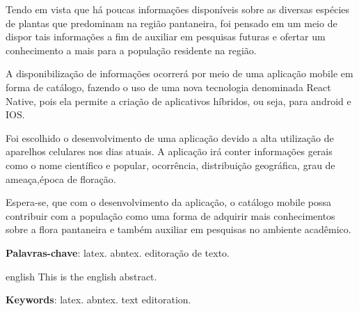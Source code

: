 
\setlength{\absparsep}{18pt} %
\begin{resumo}
	
	Tendo em vista que há poucas informações disponíveis sobre as diversas espécies de plantas que predominam na região pantaneira, foi pensado em um meio de dispor tais informações a fim de auxiliar em pesquisas futuras e ofertar um conhecimento a mais para a população residente na região.
	
	A disponibilização de informações ocorrerá por meio de uma aplicação mobile em forma de catálogo, fazendo o uso de uma nova tecnologia denominada React Native, pois ela permite a criação de aplicativos híbridos, ou seja, para android e IOS.
	
	Foi escolhido o desenvolvimento de uma aplicação devido a alta utilização de aparelhos celulares nos dias atuais. A aplicação irá conter informações gerais como o nome científico e popular, ocorrência, distribuição geográfica, grau de ameaça,época de floração.
	
	Espera-se, que com o desenvolvimento da aplicação, o  catálogo mobile possa contribuir com a população como uma forma de adquirir mais conhecimentos sobre a flora pantaneira e também auxiliar em pesquisas no ambiente acadêmico.


 \textbf{Palavras-chave}: latex. abntex. editoração de texto.
\end{resumo}

\begin{resumo}[Abstract]
 \begin{otherlanguage*}{english}
   This is the english abstract.

   \vspace{\onelineskip}
 
   \noindent 
   \textbf{Keywords}: latex. abntex. text editoration.
 \end{otherlanguage*}
\end{resumo}
